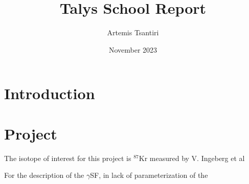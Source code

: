 \documentclass{article}
\title{Talys School Report}
\author{Artemis Tsantiri}
\date{November 2023}
\newcommand{\nuc}[2]{$^{#1#2}$}
\newcommand{\g}{$\gamma$}
\begin{document}
\maketitle

\section{Introduction}
\section{Project}
The isotope of interest for this project is \nuc87Kr measured by V. Ingeberg et al%
\par For the description of the \g SF, in lack of parameterization of the
\end{document}
